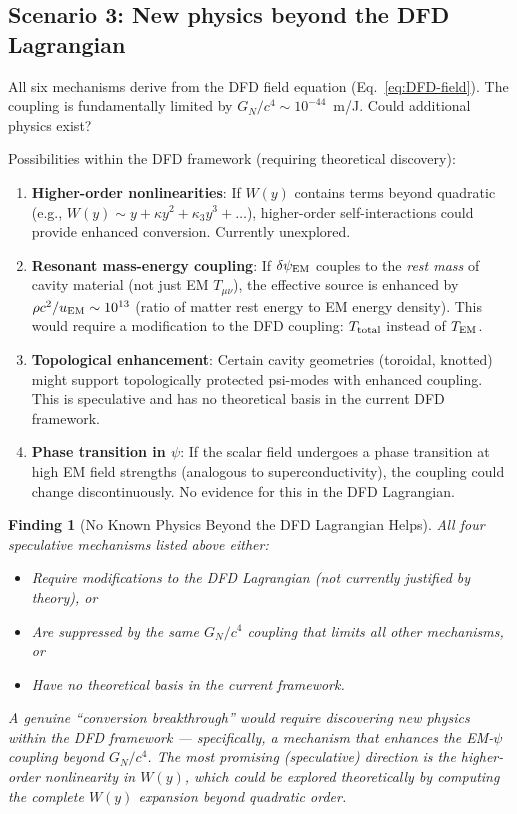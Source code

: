 \documentclass[11pt]{article}
\newtheorem{finding}{Finding}
\newcommand{\dpsiEM}{\delta\psi_{\rm EM}}
\newcommand{\GN}{G_N}
\begin{document}
\subsection{Scenario 3: New physics beyond the DFD Lagrangian}

All six mechanisms derive from the DFD field equation
(Eq.~\ref{eq:DFD-field}). The coupling is fundamentally limited by
$\GN/c^4 \sim 10^{-44}$~m/J. Could additional physics exist?

Possibilities within the DFD framework (requiring theoretical discovery):
\begin{enumerate}
\item \textbf{Higher-order nonlinearities}: If $W(y)$ contains terms
  beyond quadratic (e.g., $W(y) \sim y + \kappa y^2 + \kappa_3 y^3 +
  \ldots$), higher-order self-interactions could provide enhanced
  conversion. Currently unexplored.

\item \textbf{Resonant mass-energy coupling}: If $\dpsiEM$ couples
  to the \emph{rest mass} of cavity material (not just EM $T_{\mu\nu}$),
  the effective source is enhanced by $\rho c^2/u_{\rm EM} \sim 10^{13}$
  (ratio of matter rest energy to EM energy density). This would
  require a modification to the DFD coupling: $T_{\rm total}$ instead
  of $T_{\rm EM}$.

\item \textbf{Topological enhancement}: Certain cavity geometries
  (toroidal, knotted) might support topologically protected psi-modes
  with enhanced coupling. This is speculative and has no theoretical
  basis in the current DFD framework.

\item \textbf{Phase transition in $\psi$}: If the scalar field
  undergoes a phase transition at high EM field strengths (analogous
  to superconductivity), the coupling could change discontinuously.
  No evidence for this in the DFD Lagrangian.
\end{enumerate}

\begin{finding}[No Known Physics Beyond the DFD Lagrangian Helps]
\label{find:no-new-physics}
All four speculative mechanisms listed above either:
\begin{itemize}[nosep]
\item Require modifications to the DFD Lagrangian (not currently
  justified by theory), or
\item Are suppressed by the same $\GN/c^4$ coupling that limits
  all other mechanisms, or
\item Have no theoretical basis in the current framework.
\end{itemize}

A genuine ``conversion breakthrough'' would require discovering new
physics within the DFD framework --- specifically, a mechanism that
enhances the EM-$\psi$ coupling beyond $\GN/c^4$. The most promising
(speculative) direction is the higher-order nonlinearity in $W(y)$,
which could be explored theoretically by computing the complete $W(y)$
expansion beyond quadratic order.
\end{finding}
\end{document}
